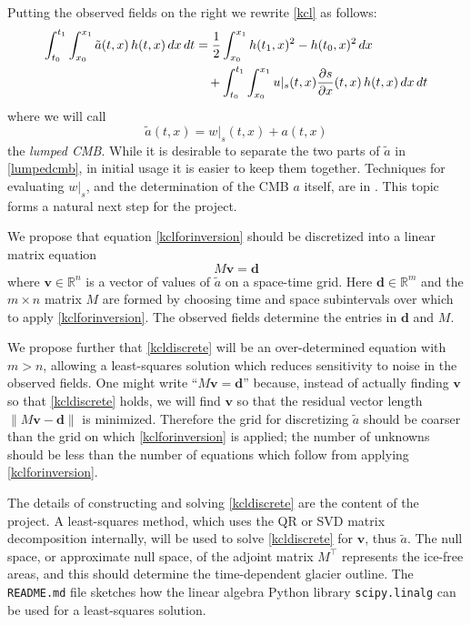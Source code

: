 \documentclass[letterpaper,final,12pt,reqno]{amsart}
\newcommand{\RR}{\mathbb{R}}
\newcommand{\bd}{\mathbf{d}}
\newcommand{\bv}{\mathbf{v}}
\begin{document}
Putting the observed fields on the right we rewrite \eqref{kcl} as follows:
\begin{align}
\int_{t_0}^{t_1} \int_{x_0}^{x_1} \tilde a(t,x) \, h(t,x)\,dx\,dt &= \frac{1}{2} \int_{x_0}^{x_1} h(t_1,x)^2 - h(t_0,x)^2\,dx  \label{kclforinversion} \\
    &\quad + \int_{t_0}^{t_1} \int_{x_0}^{x_1} u|_s(t,x) \frac{\partial s}{\partial x}(t,x)\,h(t,x) \,dx\,dt \notag
\end{align}
where we will call
\begin{equation}
\tilde a(t,x) = w|_s(t,x) + a(t,x) \label{lumpedcmb}
\end{equation}
the \emph{lumped CMB}.  While it is desirable to separate the two parts of $\tilde a$ in \eqref{lumpedcmb}, in initial usage it is easier to keep them together.  Techniques for evaluating $w|_s$, and the determination of the CMB $a$ itself, are in \cite{GudmundssonBauder1999}.  This topic forms a natural next step for the project.

We propose that equation \eqref{kclforinversion} should be discretized into a linear matrix equation
\begin{equation}
M \bv = \bd \label{kcldiscrete}
\end{equation}
where $\bv\in\RR^n$ is a vector of values of $\tilde a$ on a space-time grid.  Here $\bd\in\RR^m$ and the $m\times n$ matrix $M$ are formed by choosing time and space subintervals over which to apply \eqref{kclforinversion}.  The observed fields determine the entries in $\bd$ and $M$.

We propose further that \eqref{kcldiscrete} will be an over-determined equation with $m>n$, allowing a least-squares solution which reduces sensitivity to noise in the observed fields.  One might write ``$M \bv = \bd$'' because, instead of actually finding $\bv$ so that \eqref{kcldiscrete} holds, we will find $\bv$ so that the residual vector length $\|M\bv - \bd\|$ is minimized.  Therefore the grid for discretizing $\tilde a$ should be coarser than the grid on which \eqref{kclforinversion} is applied; the number of unknowns should be less than the number of equations which follow from applying \eqref{kclforinversion}.

The details of constructing and solving \eqref{kcldiscrete} are the content of the project.  A least-squares method, which uses the QR or SVD matrix decomposition internally, will be used to solve \eqref{kcldiscrete} for $\bv$, thus $\tilde a$.  The null space, or approximate null space, of the adjoint matrix $M^\top$ represents the ice-free areas, and this should determine the time-dependent glacier outline.  The \texttt{README.md} file sketches how the linear algebra Python library \texttt{scipy.linalg} can be used for a least-squares solution.
\end{document}
